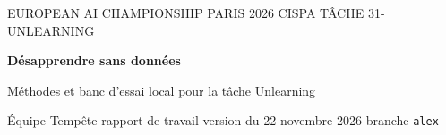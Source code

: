 \documentclass[11pt,a4paper]{article}
\newcommand{\code}[1]{\texttt{#1}}
\begin{document}
\thispagestyle{empty}
\begin{tcolorbox}[enhanced,colback=encre,colframe=encre,arc=0pt,outer arc=0pt,boxrule=0pt,
  left=14pt,right=14pt,top=14pt,bottom=14pt]
  {\sffamily\small\color{sarcelle!70!white}EUROPEAN AI CHAMPIONSHIP PARIS 2026 \textperiodcentered{} CISPA \textperiodcentered{} TÂCHE 31-UNLEARNING}\par\medskip
  {\sffamily\bfseries\fontsize{24}{28}\selectfont\color{white}Désapprendre sans données}\par\smallskip
  {\sffamily\large\color{white!85!bleu}Méthodes et banc d'essai local pour la tâche Unlearning}\par\bigskip
  {\sffamily\small\color{white!75!bleu}Équipe Tempête \textperiodcentered{} rapport de travail
  \textperiodcentered{} version du 22 novembre 2026 \textperiodcentered{} branche \code{alex}}
\end{tcolorbox}
\end{document}

